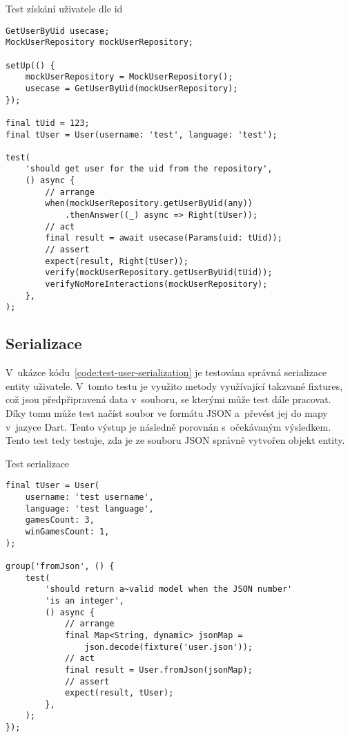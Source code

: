 \begin{listing}
    \caption{Test získání uživatele dle id}
    \label{code:test-get-user}
    \begin{verbatim}
GetUserByUid usecase;
MockUserRepository mockUserRepository;

setUp(() {
    mockUserRepository = MockUserRepository();
    usecase = GetUserByUid(mockUserRepository);
});

final tUid = 123;
final tUser = User(username: 'test', language: 'test');

test(
    'should get user for the uid from the repository',
    () async {
        // arrange
        when(mockUserRepository.getUserByUid(any))
            .thenAnswer((_) async => Right(tUser));
        // act
        final result = await usecase(Params(uid: tUid));
        // assert
        expect(result, Right(tUser));
        verify(mockUserRepository.getUserByUid(tUid));
        verifyNoMoreInteractions(mockUserRepository);
    },
);
    \end{verbatim}
\end{listing}

\subsection{Serializace}

V~ukázce kódu~\ref{code:test-user-serialization} je testována správná
serializace entity uživatele.
V~tomto testu je využito metody využívající takzvané fixtures,
což jsou předpřipravená data v~souboru,
se kterými může test dále pracovat.
Díky tomu může test načíst soubor ve formátu JSON a~převést jej do mapy v~jazyce
Dart.
Tento výstup je následně porovnán s~očekávaným výsledkem.
Tento test tedy testuje,
zda je ze souboru JSON správně vytvořen objekt entity.

\begin{listing}
    \caption{Test serializace}
    \label{code:test-user-serialization}
    \begin{verbatim}
final tUser = User(
    username: 'test username',
    language: 'test language',
    gamesCount: 3,
    winGamesCount: 1,
);

group('fromJson', () {
    test(
        'should return a~valid model when the JSON number'
        'is an integer',
        () async {
            // arrange
            final Map<String, dynamic> jsonMap =
                json.decode(fixture('user.json'));
            // act
            final result = User.fromJson(jsonMap);
            // assert
            expect(result, tUser);
        },
    );
});
    \end{verbatim}
\end{listing}

